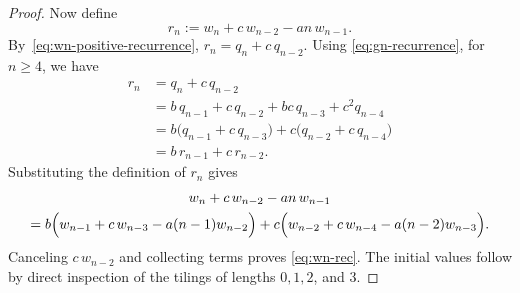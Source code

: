 \documentclass[10pt,a4paper]{amsart}
\begin{document}
\begin{proof}
Now define
\[
r_n:=w_n+c\,w_{n-2}-an\,w_{n-1}.
\]
By~\eqref{eq:wn-positive-recurrence}, $r_n=q_n+c\,q_{n-2}$. Using \eqref{eq:gn-recurrence}, for $n\geq 4$, we have
\begin{align*}
r_n
&=q_n+c\,q_{n-2}\\
&=b\,q_{n-1}+c\,q_{n-2}
  +bc\,q_{n-3}+c^2q_{n-4}\\
&=b\bigl(q_{n-1}+c\,q_{n-3}\bigr)
  +c\bigl(q_{n-2}+c\,q_{n-4}\bigr)\\
&=b\,r_{n-1}+c\,r_{n-2}.
\end{align*}
Substituting the definition of $r_n$ gives
\begin{multline*}
w_n+c\,w_{n-2}-an\,w_{n-1}
\\=
b\Bigl(
w_{n-1}+c\,w_{n-3}-a(n-1)w_{n-2}
\Bigr)+
c\Bigl(
w_{n-2}+c\,w_{n-4}-a(n-2)w_{n-3}
\Bigr).
\end{multline*}
Canceling $c\,w_{n-2}$ and collecting terms proves \eqref{eq:wn-rec}. The initial values follow by direct inspection of the tilings of lengths $0,1,2$, and $3$.
\end{proof}
\end{document}
